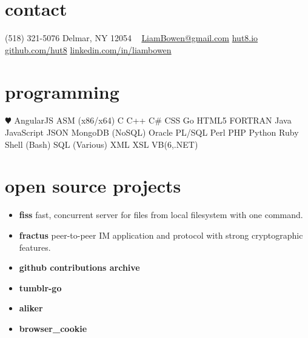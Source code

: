 \documentclass[]{friggeri-cv} %
\begin{document}


\begin{aside} %
\section{contact}
(518) 321-5076
Delmar, NY 12054
~
\href{mailto:LiamBowen@gmail.com}{LiamBowen@gmail.com}
\href{http://hut8.io}{hut8.io}
\href{https://github.com/hut8}{github.com/hut8}
\href{https://linkedin.com/in/liambowen}{linkedin.com/in/liambowen}
~
\section{programming}
{\color{red} $\varheartsuit$}
AngularJS
ASM (x86/x64)
C
C++
C\#
CSS
Go
HTML5
FORTRAN
Java
JavaScript
JSON
MongoDB (NoSQL)
Oracle PL/SQL
Perl
PHP
Python
Ruby
Shell (Bash)
SQL (Various)
XML
XSL
VB(6,.NET)
\end{aside}


\section{open source projects}

\begin{itemize}
\item \textbf{fiss} fast, concurrent server for files from local filesystem with one command.
\item \textbf{fractus} peer-to-peer IM application and protocol with strong cryptographic features.
\item \textbf{github contributions archive} 
\item \textbf{tumblr-go}
\item \textbf{aliker}
\item \textbf{browser\_cookie}
\end{itemize}

\end{document}
